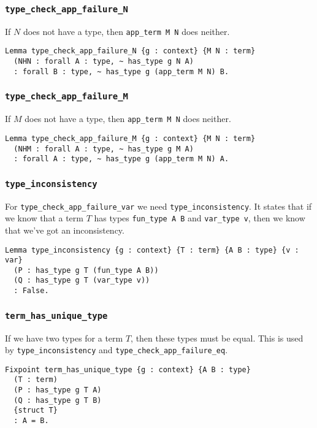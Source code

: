 \documentclass[a4paper, 10pt]{amsart}
\begin{document}
	\subsubsection{\lstinline{type_check_app_failure_N}}

	If $N$ does not have a type, then \lstinline{app_term M N} does neither.
\begin{lstlisting}
Lemma type_check_app_failure_N {g : context} {M N : term}
  (NHN : forall A : type, ~ has_type g N A)
  : forall B : type, ~ has_type g (app_term M N) B.
\end{lstlisting}

	\subsubsection{\lstinline{type_check_app_failure_M}}
	
	If $M$ does not have a type, then \lstinline{app_term M N} does neither.
\begin{lstlisting}
Lemma type_check_app_failure_M {g : context} {M N : term}
  (NHM : forall A : type, ~ has_type g M A)
  : forall A : type, ~ has_type g (app_term M N) A.
\end{lstlisting}

	\subsubsection{\lstinline{type_inconsistency}}
	
	For \lstinline{type_check_app_failure_var} we need \lstinline{type_inconsistency}.
	It states that if we know that a term $T$ has types \lstinline{fun_type A B} and \lstinline{var_type v}, then we know that we've got an inconsistency.
\begin{lstlisting}
Lemma type_inconsistency {g : context} {T : term} {A B : type} {v : var}
  (P : has_type g T (fun_type A B))
  (Q : has_type g T (var_type v))
  : False.
\end{lstlisting}

	\subsubsection{\lstinline{term_has_unique_type}}
	
	If we have two types for a term $T$, then these types must be equal.
	This is used by \lstinline{type_inconsistency} and \lstinline{type_check_app_failure_eq}.
\begin{lstlisting}
Fixpoint term_has_unique_type {g : context} {A B : type}
  (T : term)
  (P : has_type g T A)
  (Q : has_type g T B)
  {struct T}
  : A = B.
\end{lstlisting}
\end{document}
